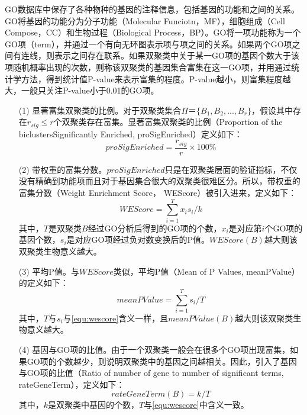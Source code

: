   GO数据库中保存了各种物种的基因的注释信息，包括基因的功能和之间的关系。GO将基因的功能分为分子功能（Molecular Funciotn，MF），细胞组成（Cell Compose，CC）和生物过程（Biological Process，BP）。GO将一项功能称为一个GO项（term），并通过一个有向无环图表示项与项之间的关系。如果两个GO项之间有连线，则表示之间存在联系。如果双聚类中关于某一GO项的基因个数大于该项随机概率出现的次数，则称该双聚类的基因集合富集在这一GO项，并用通过统计学方法，得到统计值P-value来表示富集的程度。P-value越小，则富集程度越大，一般只关注P-value小于0.01的GO项。  
  \begin{enumerate}
    \item[(1)] 显著富集双聚类的比例。对于双聚类集合$\Pi＝\{B_1,B_2,...,B_r\}$，假设其中存在$r_{sig} \le r$个双聚类存在富集。显著富集双聚类的比例（Proportion of the biclustersSignificantly Enriched, proSigEnriched）定义如下：
    \begin{equation}
      proSigEnriched = \frac{r_{sig}}{r} \times 100\%
    \end{equation}

    \item[(2)] 带权重的富集分数。$proSigEnriched$只是在双聚类层面的验证指标，不仅没有精确到功能项而且对于基因集合很大的双聚类很难区分。所以，带权重的富集分数（Weight Enrichment Score， WEScore）被引入进来，定义如下：
    \begin{equation}\label{equ:wescore}
      WEScore = \sum_{i=1}^Tx_is_i/k
    \end{equation}
    \hspace{2em}其中，$T$是双聚类$B$经过GO分析后得到的GO项的个数，$x_i$是对应第$i$个GO项的基因个数，$s_i$是对应GO项经过负对数变换后的P值。$WEScore(B)$越大则该双聚类生物意义越大。

    \item[(3)] 平均P值。与$WEScore$类似，平均P值（Mean of P Values, meanPValue）的定义如下：
    \begin{equation}\label{equ:meanP}
      meanPValue = \sum_{i=1}^Ts_i/T
    \end{equation}
    \hspace{2em}其中，$T$与$s_i$与\ref{equ:wescore}含义一样，且$meanPValue(B)$越大则该双聚类生物意义越大。

    \item[(4)] 基因与GO项的比值。由于一个双聚类一般会在很多个GO项出现富集，如果GO项的个数越少，则说明双聚类中的基因之间越相关。因此，引入了基因与GO项的比值（Ratio of number of gene to number of significant terms, rateGeneTerm），定义如下：
    \begin{equation}
     rateGeneTerm(B) = k / T 
    \end{equation}
    \hspace{2em}其中，$k$是双聚类中基因的个数，$T$与\ref{equ:wescore}中含义一致。
  \end{enumerate}

